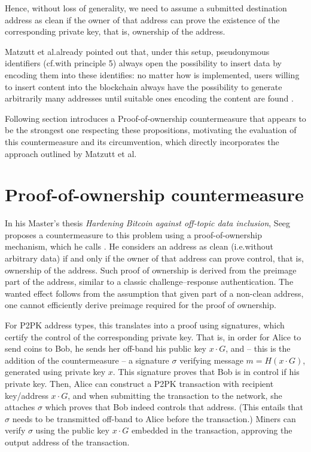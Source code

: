 \documentclass[a4paper,11pt,titlepage]{scrbook}
\begin{document}
Hence, without loss of generality, we need to assume a submitted destination address as clean if the owner of that address can prove the existence of the corresponding private key, that is, ownership of the address.

Matzutt et al.\@ already pointed out that, under this setup, pseudonymous identifiers (cf.\@ with principle 5) always open the possibility to insert data by encoding them into these identifies: no matter how  is implemented, users willing to insert content into the blockchain always have the possibility to generate arbitrarily many addresses until suitable ones encoding the content are found \cite[Sec.~III.C]{matzutt_thwarting_2018}.

Following section introduces a Proof-of-ownership countermeasure that appears to be the strongest one respecting these propositions, motivating the evaluation of this countermeasure and its circumvention, which directly incorporates the approach outlined by Matzutt et al.


\section{Proof-of-ownership countermeasure}

In his Master's thesis \emph{Hardening Bitcoin against off-topic data inclusion}, Seeg proposes a countermeasure to this problem using a proof-of-ownership mechanism, which he calls  \cite{seeg_hardening_2018}.
%
He considers an address as clean (i.e.\@ without arbitrary data) if and only if the owner of that address can prove control, that is, ownership of the address.
Such proof of ownership is derived from the  preimage part of the address, similar to a classic challenge–response authentication.
The wanted effect follows from the assumption that given  part of a non-clean address, one cannot efficiently derive  preimage required for the proof of ownership.

For P2PK address types, this translates into a proof using signatures, which certify the control of the corresponding private key.
That is, in order for Alice to send coins to Bob, he sends her off-band his public key $x\cdot G$, and – this is the addition of the countermeasure – a signature $\sigma$ verifying message $m=H(x\cdot G)$, generated using private key $x$.
This signature proves that Bob is in control if his private key.
Then, Alice can construct a P2PK transaction with recipient key/address $x\cdot G$, and when submitting the transaction to the network, she attaches $\sigma$ which proves that Bob indeed controls that address. 
(This entails that $\sigma$ needs to be transmitted off-band to Alice before the transaction.)
Miners can verify $\sigma$ using the public key $x\cdot G$ embedded in the transaction, approving the output address of the transaction.
\end{document}
